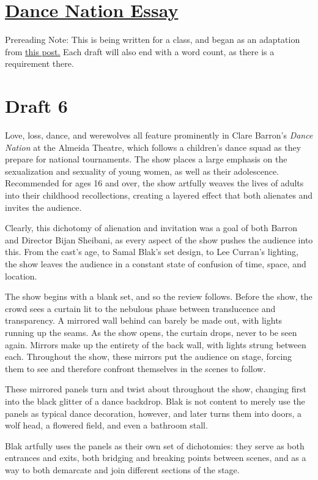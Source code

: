 \documentclass[12pt]{article}[titlepage]
\newcommand{\1}{\={a}}
\newcommand{\2}{\={e}}
\newcommand{\3}{\={\i}}
\newcommand{\4}{\=o}
\newcommand{\5}{\=u}
\newcommand{\6}{\={A}}
\renewcommand{\,}{\textsuperscript{,}}
\begin{document}
\doublespacing
\section{\href{dance-nation-essay.html}{Dance Nation Essay}}
Prereading Note: This is being written for a class, and began as an adaptation from \href{dance-nation.html}{this post.}
Each draft will also end with a word count, as there is a requirement there.

\section{Draft 6}
Love, loss, dance, and werewolves all feature prominently in Clare Barron's \textit{Dance Nation} at the Almeida Theatre, which follows a children's dance squad as they prepare for national tournaments. The show places a large emphasis on the sexualization and sexuality of young women, as well as their adolescence. Recommended for ages 16 and over, the show artfully weaves the lives of adults into their childhood recollections, creating a layered effect that both alienates and invites the audience.

Clearly, this dichotomy of alienation and invitation was a goal of both Barron and Director Bijan Sheibani, as every aspect of the show pushes the audience into this. From the cast's age, to Samal Blak's set design, to Lee Curran's lighting, the show leaves the audience in a constant state of confusion of time, space, and location.

The show begins with a blank set, and so the review follows. Before the show, the crowd sees a curtain lit to the nebulous phase between translucence and transparency. A mirrored wall behind can barely be made out, with lights running up the seams. As the show opens, the curtain drops, never to be seen again. Mirrors make up the entirety of the back wall, with lights strung between each. Throughout the show, these mirrors put the audience on stage, forcing them to see and therefore confront themselves in the scenes to follow.

These mirrored panels turn and twist about throughout the show, changing first into the black glitter of a dance backdrop. Blak is not content to merely use the panels as typical dance decoration, however, and later turns them into doors, a wolf head, a flowered field, and even a bathroom stall.

Blak artfully uses the panels as their own set of dichotomies: they serve as both entrances and exits, both bridging and breaking points between scenes, and as a way to both demarcate and join different sections of the stage.
\end{document}
